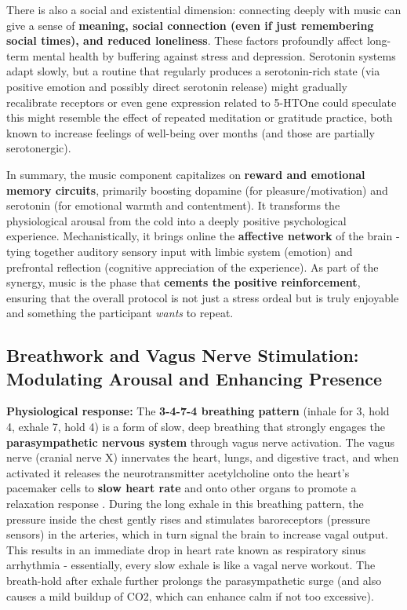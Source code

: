 \documentclass[11pt]{article}
\begin{document}
There is also a social and existential dimension: connecting deeply with music can give a sense of \textbf{meaning, social connection (even if just remembering social times), and reduced loneliness}. These factors profoundly affect long-term mental health by buffering against stress and depression. Serotonin systems adapt slowly, but a routine that regularly produces a serotonin-rich state (via positive emotion and possibly direct serotonin release) might gradually recalibrate receptors or even gene expression related to 5-HT\. One could speculate this might resemble the effect of repeated meditation or gratitude practice, both known to increase feelings of well-being over months (and those are partially serotonergic).

In summary, the music component capitalizes on \textbf{reward and emotional memory circuits}, primarily boosting dopamine (for pleasure/motivation) and serotonin (for emotional warmth and contentment). It transforms the physiological arousal from the cold into a deeply positive psychological experience. Mechanistically, it brings online the \textbf{affective network} of the brain - tying together auditory sensory input with limbic system (emotion) and prefrontal reflection (cognitive appreciation of the experience). As part of the synergy, music is the phase that \textbf{cements the positive reinforcement}, ensuring that the overall protocol is not just a stress ordeal but is truly enjoyable and something the participant \textit{wants} to repeat.

\subsection{Breathwork and Vagus Nerve Stimulation: Modulating Arousal and Enhancing Presence}
\textbf{Physiological response:} The \textbf{3-4-7-4 breathing pattern} (inhale for 3, hold 4, exhale 7, hold 4) is a form of slow, deep breathing that strongly engages the \textbf{parasympathetic nervous system} through vagus nerve activation. The vagus nerve (cranial nerve X) innervates the heart, lungs, and digestive tract, and when activated it releases the neurotransmitter acetylcholine onto the heart's pacemaker cells to \textbf{slow heart rate} and onto other organs to promote a relaxation response \cite{BIRDEE2023102937}. During the long exhale in this breathing pattern, the pressure inside the chest gently rises and stimulates baroreceptors (pressure sensors) in the arteries, which in turn signal the brain to increase vagal output. This results in an immediate drop in heart rate known as respiratory sinus arrhythmia - essentially, every slow exhale is like a vagal nerve workout. The breath-hold after exhale further prolongs the parasympathetic surge (and also causes a mild buildup of CO2, which can enhance calm if not too excessive).
\end{document}
